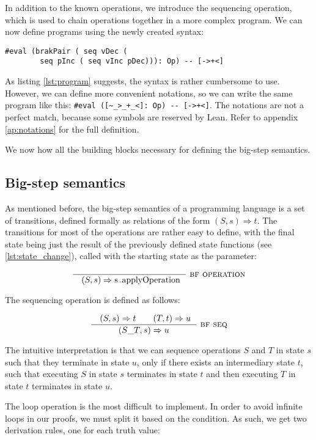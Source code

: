 \documentclass[runningheads]{llncs}
\newcommand{\cc}{\lstinline[mathescape]}
\begin{document}
In addition to the known operations, we introduce the sequencing operation,
which is used to chain operations together in a more complex program. We
can now define programs using the newly created syntax:

\vspace{2mm}
\begin{lstlisting}[label=lst:program, 
    caption=Defining programs using the Op syntax]
#eval (brakPair ( seq vDec (
        seq pInc ( seq vInc pDec))): Op) -- [->+<]
\end{lstlisting}

As listing \ref{lst:program} suggests, the syntax is rather cumbersome to
use. However, we can define more convenient notations, so we can write the
same program like this: \cc{#eval ([~_>_+_<]: Op) -- [->+<]}. The notations
are not a perfect match, because some symbols are reserved by Lean. Refer to appendix \ref{ap:notations} for the full definition.

We now how all the building blocks necessary for defining the big-step
semantics.

\subsection{Big-step semantics}

As mentioned before, the big-step semantics of a programming language is a set
of transitions, defined formally as relations of the form $(S,s) \Rightarrow
t$. The transitions for most of the operations are rather easy to define, with
the final state being just the result of the previously defined state functions
(see \ref{lst:state_change}), called with the starting state as the parameter:

$$\frac{}{\quad (S, s) \Rightarrow \text{\cc{s.applyOperation}}\ \ }
     \ \textsc{bf operation}$$

The sequencing operation is defined as follows:

$$\frac{\quad(S, s) \Rightarrow t \qquad (T, t) \Rightarrow u\ \ }
     {(S\_T, s) \Rightarrow u}
     \ \textsc{bf seq}$$

The intuitive interpretation is that we can sequence operations $S$ and $T$ in
state $s$ such that they terminate in state $u$, only if there exists an
intermediary state $t$, such that executing $S$ in state $s$ terminates in
state $t$ and then executing $T$ in state $t$ terminates in state $u$.

The loop operation is the most difficult to implement. In order to avoid
infinite loops in our proofs, we must split it based on the condition. As
such, we get two derivation rules, one for each truth value:
\end{document}
